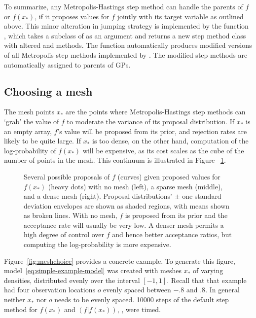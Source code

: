 \documentclass[article]{jss}
\begin{document}
\smallskip

To summarize, any Metropolis-Hastings step method can handle the parents of $f$ or $f(x_*)$, if it proposes values for $f$ jointly with its target variable as outlined above. This minor alteration in jumping strategy is implemented by the function \\, which takes a subclass of  as an argument and returns a new step method class with altered  and  methods. The function automatically produces modified versions of all Metropolis step methods implemented by  \citep{pymc}. The modified step methods are automatically assigned to parents of GPs.

\subsection{Choosing a mesh} 
\label{sec:mesh-choice} 
The mesh points $x_*$ are the points where Metropolis-Hastings step methods can `grab' the value of $f$ to moderate the variance of its proposal distribution. If $x_*$ is an empty array, $f$'s value will be proposed from its prior, and rejection rates are likely to be quite large. If $x_*$ is too dense, on the other hand, computation of the log-probability of $f(x_*)$ will be expensive, as its cost scales as the cube of the number of points in the mesh. This continuum is illustrated in Figure~ \ref{fig:meshpropose}.

\begin{figure}
    \centering
    \caption{Several possible proposals of $f$ (curves) given proposed values for $f(x_*)$ (heavy dots) with no mesh (left), a sparse mesh (middle), and a dense mesh (right). Proposal distributions'  $\pm$ one standard deviation envelopes are shown as shaded regions, with means shown as broken lines. With no mesh, $f$ is proposed from its prior and the acceptance rate will usually be very low. A denser mesh permits a high degree of control over $f$ and hence better acceptance ratios, but computing the log-probability is more expensive.}
    \label{fig:meshpropose}
\end{figure}


Figure~\ref{fig:meshchoice} provides a concrete example. To generate this figure, model~\ref{eq:simple-example-model} was created with meshes $x_*$ of varying densities, distributed evenly over the interval $[-1,1]$. Recall that that example had four observation locations $o$ evenly spaced between $-.8$ and $.8$. In general neither $x_*$ nor $o$ needs to be evenly spaced. 10000 steps of the default step method for $f(x_*)$ and $(f|f(x_*))$, , were timed. 
\end{document}
